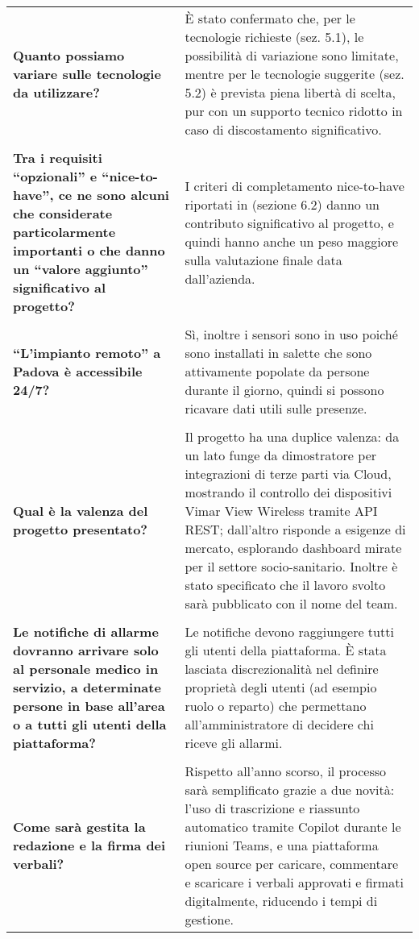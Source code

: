 \documentclass[a4paper,12pt]{article}
\begin{document}
\begin{longtable}{P{5cm}|P{10cm}} 
\textbf{Quanto possiamo variare sulle tecnologie da utilizzare?} & È stato confermato che, per le tecnologie richieste (sez. 5.1), le possibilità di variazione sono limitate, mentre per le tecnologie suggerite (sez. 5.2) è prevista piena libertà di scelta, pur con un supporto tecnico ridotto in caso di discostamento significativo.\\

\\
\textbf{Tra i requisiti “opzionali” e “nice-to-have”, ce ne sono alcuni che considerate particolarmente importanti o che danno un “valore aggiunto” significativo al progetto?} & I criteri di completamento nice-to-have riportati in (sezione 6.2) danno un contributo significativo al progetto, e quindi hanno anche un peso maggiore sulla valutazione finale data dall'azienda.\\

\\
\textbf{“L’impianto remoto” a Padova è accessibile 24/7?} & Sì, inoltre i sensori sono in uso poiché sono installati in salette che sono attivamente popolate da persone durante il giorno, quindi si possono ricavare dati utili sulle presenze.\\

\\
\textbf{Qual è la valenza del progetto presentato?} & Il progetto ha una duplice valenza: da un lato funge da dimostratore per integrazioni di terze parti via Cloud, mostrando il controllo dei dispositivi Vimar View Wireless tramite API REST; dall’altro risponde a esigenze di mercato, esplorando dashboard mirate per il settore socio-sanitario. Inoltre è stato specificato che il lavoro svolto sarà pubblicato con il nome del team. \\

\\
\textbf{Le notifiche di allarme dovranno arrivare solo al personale medico in servizio, a determinate persone in base all’area o a tutti gli utenti della piattaforma?} & Le notifiche devono raggiungere tutti gli utenti della piattaforma. È stata lasciata discrezionalità nel definire proprietà degli utenti (ad esempio ruolo o reparto) che permettano all’amministratore di decidere chi riceve gli allarmi. \\

\\
\textbf{Come sarà gestita la redazione e la firma dei verbali?} & Rispetto all’anno scorso, il processo sarà semplificato grazie a due novità: l’uso di trascrizione e riassunto automatico tramite Copilot durante le riunioni Teams, e una piattaforma open source per caricare, commentare e scaricare i verbali approvati e firmati digitalmente, riducendo i tempi di gestione. \\


\end{longtable}
\end{document}
